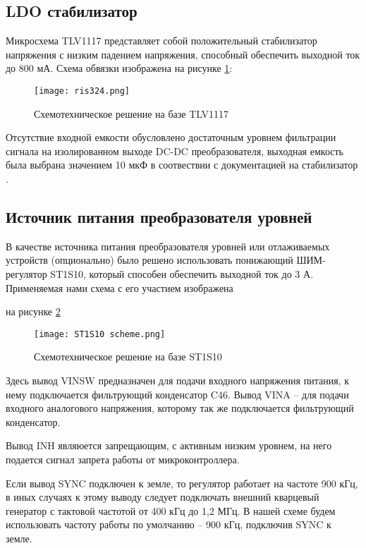 \subsection{LDO стабилизатор}
\hspace{1cm}

Микросхема TLV1117 представляет собой положительный стабилизатор напряжения с низким падением напряжения, 
способный обеспечить выходной ток до 800 мА. Схема обвязки изображена на рисунке \ref{ris:324}: 

\begin{figure}[H]
    \centering
    \texttt{[image: ris324.png]}
    \caption{Схемотехническое решение на базе TLV1117}
    \label{ris:324}
\end{figure}

Отсутствие входной емкости обусловлено достаточным уровнем фильтрации сигнала на изолированном выходе 
DC-DC преобразователя, выходная емкость была выбрана значением 10 мкФ в соотвествии с документацией 
на стабилизатор \cite{TLV1117:datasheet}. 

\subsection{Источник питания преобразователя уровней}
\hspace{1cm}

В качестве источника питания преобразователя уровней или отлаживаемых устройств (опционально) было решено 
использовать понижающий ШИМ-регулятор ST1S10, который способен обеспечить выходной ток до 3 А. 
Применяемая нами схема с его участием изображена 

на рисунке \ref{ris:ST1S10}

\begin{figure}[H]
    \centering
    \texttt{[image: ST1S10 scheme.png]}
    \caption{Схемотехническое решение на базе ST1S10}
    \label{ris:ST1S10}
\end{figure}

Здесь вывод VINSW предназначен для подачи входного напряжения питания, к нему подключается фильтрующий 
конденсатор C46. Вывод VINA -- для подачи входного аналогового напряжения, которому так же подключается 
фильтрующий конденсатор. 

Вывод INH являюется запрещающим, с активным низким уровнем, на него подается сигнал запрета работы от 
микроконтроллера. 

Если вывод SYNC подключен к земле, то регулятор работает на частоте 900 кГц, в иных случаях к этому выводу 
следует подключать внешний кварцевый генератор с тактовой частотой от 400 кГц до 1,2 МГц. В нашей схеме 
будем использовать частоту работы по умолчанию -- 900 кГц, подключив SYNC к земле. 

